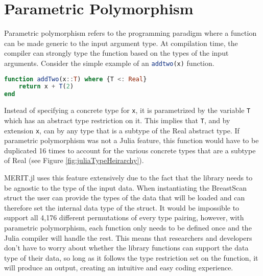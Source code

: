\FloatBarrier
\section{Parametric Polymorphism}
Parametric polymorphism refers to the programming paradigm where a function can be made generic to the input argument
type. At compilation time, the compiler can strongly type the function based on the types of the input arguments.
Consider the simple example of an \lstinline[language=Julia]{addtwo(x)} function.
\begin{lstlisting}[language=Julia]
function addTwo(x::T) where {T <: Real}
    return x + T(2)
end
\end{lstlisting}
Instead of specifying a concrete type for \lstinline[language=Julia]{x}, it is parametrized by the variable
\lstinline[language=Julia]{T} which has an abstract type restriction on it. This implies that
\lstinline[language=Julia]{T}, and by extension \lstinline[language=Julia]{x}, can by any type that is a subtype of the
Real abstract type. If parametric polymorphism was not a Julia feature, this function would have to be duplicated 16
times to account for the various concrete types that are a subtype of Real (see Figure \ref{fig:juliaTypeHeirarchy}).

MERIT.jl uses this feature extensively due to the fact that the library needs to be agnostic to the type of the input
data. When instantiating the BreastScan struct the user can provide the types of the data that will be loaded and can
therefore set the internal data type of the struct. It would be impossible to support all 4,176 different permutations
of every type pairing, however, with parametric polymorphism, each function only needs to be defined once and the Julia
compiler will handle the rest. This means that researchers and developers don't have to worry about whether the library
functions can support the data type of their data, so long as it follows the type restriction set on the function, it
will produce an output, creating an intuitive and easy coding experience.  

